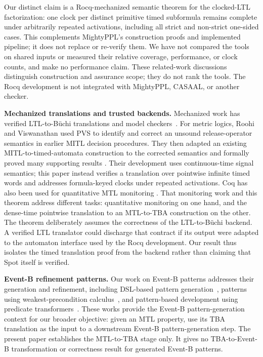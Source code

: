 \documentclass[10pt,journal,compsoc]{IEEEtran}
\newcommand{\runinhead}[1]{\par\smallskip\noindent\textbf{#1}\enspace}
\begin{document}
Our distinct claim is a Rocq-mechanized semantic theorem for the
clocked-LTL factorization: one clock per distinct primitive timed subformula
remains complete under arbitrarily repeated activations, including all
strict and non-strict one-sided cases. This complements MightyPPL's
construction proofs and implemented pipeline; it does not replace or
re-verify them. We have not compared the tools on shared inputs or measured
their relative coverage, performance, or clock counts, and make no performance
claim. These related-work discussions distinguish construction and assurance
scope; they do not rank the tools. The Rocq development is not integrated with MightyPPL,
CASAAL, or another checker.

\runinhead{Mechanized translations and trusted backends.}
Mechanized work has verified LTL-to-B\"uchi translations and model
checkers~\cite{schimpf_tphols09,cava_cav13,ltl_to_gba_afp,seidl_sickert_afp19}.
For metric logics, Roohi and Viswanathan used PVS to identify and correct an
unsound release-operator semantics in earlier MITL decision procedures. They
then adapted an existing MITL-to-timed-automata construction to the corrected
semantics and formally proved many supporting results
\cite{roohi_viswanathan_vmcai18}. Their development uses continuous-time
signal semantics; this paper instead verifies a translation over pointwise
infinite timed words and addresses formula-keyed clocks under repeated
activations.
Coq has also been used for quantitative MTL monitoring
\cite{chattopadhyay_mamouras_rv20}. That monitoring work and this theorem
address different tasks: quantitative monitoring on one hand, and the
dense-time pointwise translation to an MTL-to-TBA construction on the other.
The theorem deliberately assumes the correctness of the LTL-to-B\"uchi
backend. A verified LTL translator could discharge that contract if its
output were adapted to the automaton interface used by the Rocq development.
Our result thus isolates the timed translation proof from the backend rather
than claiming that Spot itself is verified.

\runinhead{Event-B refinement patterns.}
Our work on Event-B patterns addresses their generation and refinement,
including DSL-based pattern generation~\cite{fares_abz23}, patterns using
weakest-precondition calculus~\cite{fares_facs24}, and pattern-based
development using predicate transformers~\cite{fares_scp27}. These works
provide the Event-B pattern-generation context for our broader objective:
given an MTL property, use its TBA translation as the input to a downstream
Event-B pattern-generation step. The present paper establishes the MTL-to-TBA
stage only. It gives no TBA-to-Event-B transformation or correctness result
for generated Event-B patterns.
\end{document}
